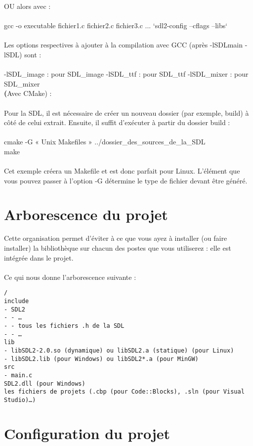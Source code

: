 \documentclass[a4paper,12pt,openany]{book}
\begin{document}
OU alors avec : \\
\\
gcc -o executable fichier1.c fichier2.c fichier3.c ...  `sdl2-config --cflags --libs` \\
\\
Les options respectives à ajouter à la compilation avec GCC (après -lSDLmain -lSDL) sont :\\
\\
-lSDL_image : pour SDL_image
-lSDL_ttf : pour SDL_ttf
-lSDL_mixer : pour SDL_mixer
\\
\textbf(Avec CMake) : \\
\\
Pour la SDL, il est nécessaire de créer un nouveau dossier (par exemple, build) à côté de celui extrait. Ensuite, il suffit d'exécuter à partir du dossier build :\\
\\
cmake -G « Unix Makefiles » ../dossier\_des\_sources\_de\_la\_SDL \\
make \\
\\
Cet exemple créera un Makefile et est donc parfait pour Linux. L'élément que vous pouvez passer à l'option -G détermine le type de fichier devant être généré.\\

\chapter{Arborescence du projet}
Cette organisation permet d'éviter à ce que vous ayez à installer (ou faire installer) la bibliothèque sur chacun des postes que vous utiliserez : elle est intégrée dans le projet.\\
\\
Ce qui nous donne l'arborescence suivante :\\
\begin{verbatim}
/
include
- SDL2
- - …
- - tous les fichiers .h de la SDL
- - …
lib
- libSDL2-2.0.so (dynamique) ou libSDL2.a (statique) (pour Linux)
- libSDL2.lib (pour Windows) ou libSDL2*.a (pour MinGW)
src
- main.c
SDL2.dll (pour Windows)
les fichiers de projets (.cbp (pour Code::Blocks), .sln (pour Visual Studio)…)
\end{verbatim}

\chapter{Configuration du projet}
\end{document}
